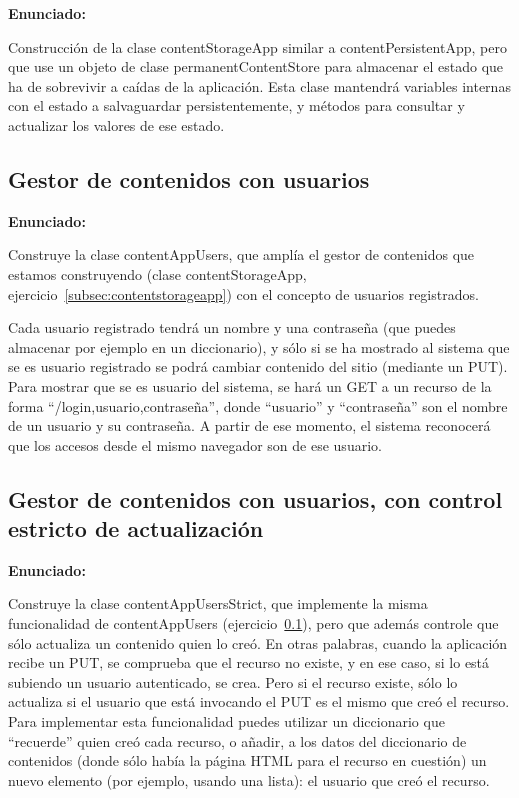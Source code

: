 {\textbf{Enunciado:}

Construcción de la clase contentStorageApp similar a contentPersistentApp, pero que use un objeto de clase permanentContentStore para almacenar el estado que ha de sobrevivir a caídas de la aplicación. Esta clase mantendrá variables internas con el estado a salvaguardar persistentemente, y métodos para consultar y actualizar los valores de ese estado.

\subsection{Gestor de contenidos con usuarios}
\label{subsec:contentappusers}

\textbf{Enunciado:}

Construye la clase contentAppUsers, que amplía el gestor de contenidos que estamos construyendo (clase contentStorageApp, ejercicio~\ref{subsec:contentstorageapp}) con el concepto de usuarios registrados.

Cada usuario registrado tendrá un nombre y una contraseña (que puedes almacenar por ejemplo en un diccionario), y sólo si se ha mostrado al sistema que se es usuario registrado se podrá cambiar contenido del sitio (mediante un PUT). Para mostrar que se es usuario del sistema, se hará un GET a un recurso de la forma ``/login,usuario,contraseña'', donde ``usuario'' y ``contraseña'' son el nombre de un usuario y su contraseña. A partir de ese momento, el sistema reconocerá que los accesos desde el mismo navegador son de ese usuario. 

\subsection{Gestor de contenidos con usuarios, con control estricto de actualización}
\label{subsec:contentappusersstrict}

\textbf{Enunciado:}

Construye la clase contentAppUsersStrict, que implemente la misma funcionalidad de contentAppUsers (ejercicio~\ref{subsec:contentappusers}), pero que además controle que sólo actualiza un contenido quien lo creó. En otras palabras, cuando la aplicación recibe un PUT, se comprueba que el recurso no existe, y en ese caso, si lo está subiendo un usuario autenticado, se crea. Pero si el recurso existe, sólo lo actualiza si el usuario que está invocando el PUT es el mismo que creó el recurso. Para implementar esta funcionalidad puedes utilizar un diccionario que ``recuerde'' quien creó cada recurso, o añadir, a los datos del diccionario de contenidos (donde sólo había la página HTML para el recurso en cuestión) un nuevo elemento (por ejemplo, usando una lista): el usuario que creó el recurso.

}
